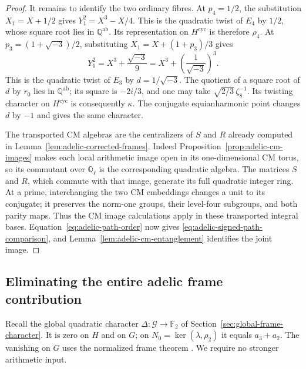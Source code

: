 \begin{proof}
It remains to identify the two ordinary fibres.  At $p_4=1/2$,
the substitution $X_1=X+1/2$ gives
$Y_1^2=X^3-X/4$.  This is the quadratic twist of $E_4$ by
$1/2$, whose square root lies in $\mathbb Q^{\mathrm{ab}}$.
Its representation on $H^{\mathrm{cyc}}$ is therefore $\rho_4$.
At $p_3=(1+\sqrt{-3})/2$, substituting
$X_1=X+(1+p_3)/3$ gives
\[
 Y_1^2=X^3+\frac{\sqrt{-3}}9
             =X^3+\left(\frac1{\sqrt{-3}}\right)^3.
\]
This is the quadratic twist of $E_3$ by
$d=1/\sqrt{-3}$.  The quotient of a square root of $d$ by $r_0$
lies in $\mathbb Q^{\mathrm{ab}}$; its square is $-2i/3$, and
one may take $\sqrt{2/3}\,\zeta_8^{-1}$.
Its twisting character on $H^{\mathrm{cyc}}$ is consequently
$\kappa$.  The conjugate equianharmonic point changes $d$ by
$-1$ and gives the same character.

The transported CM algebras are the centralizers of $S$ and $R$
already computed in Lemma~\ref{lem:adelic-corrected-frames}.
Indeed Proposition~\ref{prop:adelic-cm-images} makes each local
arithmetic image open in its one-dimensional CM torus, so its
commutant over $\mathbb Q_\ell$ is the corresponding quadratic
algebra.  The matrices $S$ and $R$, which commute with that image,
generate its full quadratic integer ring.
At a prime, interchanging the two CM embeddings changes a unit
to its conjugate; it preserves the norm-one groups, their level-four
subgroups, and both parity maps.  Thus the CM image calculations
apply in these transported integral bases.
Equation~\eqref{eq:adelic-path-order} now gives
\eqref{eq:adelic-signed-path-comparison}, and
Lemma~\ref{lem:adelic-cm-entanglement} identifies the joint image.
\end{proof}

\subsection{Eliminating the entire adelic frame contribution}

Recall the global quadratic character $\Delta:\mathcal G\to
\mathbb F_2$ of Section~\ref{sec:global-frame-character}.
It is zero on $H$ and on $G$; on
$N_0=\ker(\lambda,\rho_2)$ it equals $a_3+a_2$.
The vanishing on $G$ uses the normalized frame theorem
\cite[Theorem~3]{H17}.  We require no stronger arithmetic input.


